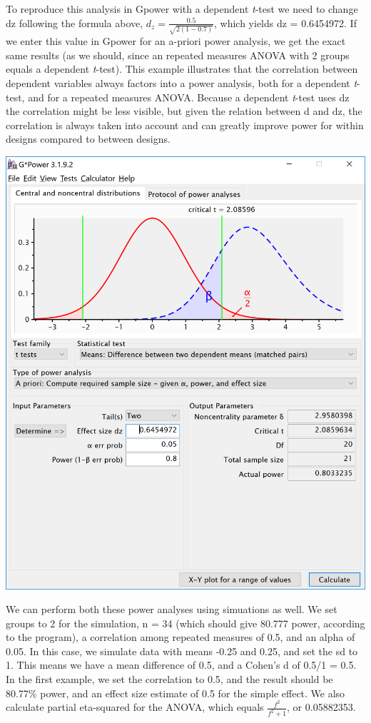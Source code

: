 \documentclass[]{book}
\begin{document}
To reproduce this analysis in Gpower with a dependent \emph{t}-test we need to change dz following the formula above, \(d_{z}=\frac{0.5}{\sqrt{2(1-0.7)}}\), which yields dz = 0.6454972. If we enter this value in Gpower for an a-priori power analysis, we get the exact same results (as we should, since an repeated measures ANOVA with 2 groups equals a dependent \emph{t}-test). This example illustrates that the correlation between dependent variables always factors into a power analysis, both for a dependent \emph{t}-test, and for a repeated measures ANOVA. Because a dependent \emph{t}-test uses dz the correlation might be less visible, but given the relation between d and dz, the correlation is always taken into account and can greatly improve power for within designs compared to between designs.

\includegraphics{screenshots/gpower_10.png}

We can perform both these power analyses using simuations as well. We set groups to 2 for the simulation, n = 34 (which should give 80.777 power, according to the \citet{faul2007g} program), a correlation among repeated measures of 0.5, and an alpha of 0.05. In this case, we simulate data with means -0.25 and 0.25, and set the sd to 1. This means we have a mean difference of 0.5, and a Cohen's d of 0.5/1 = 0.5. In the first example, we set the correlation to 0.5, and the result should be 80.77\% power, and an effect size estimate of 0.5 for the simple effect. We also calculate partial eta-squared for the ANOVA, which equals \(\frac{f^2}{f^2+1}\), or 0.05882353.
\end{document}
